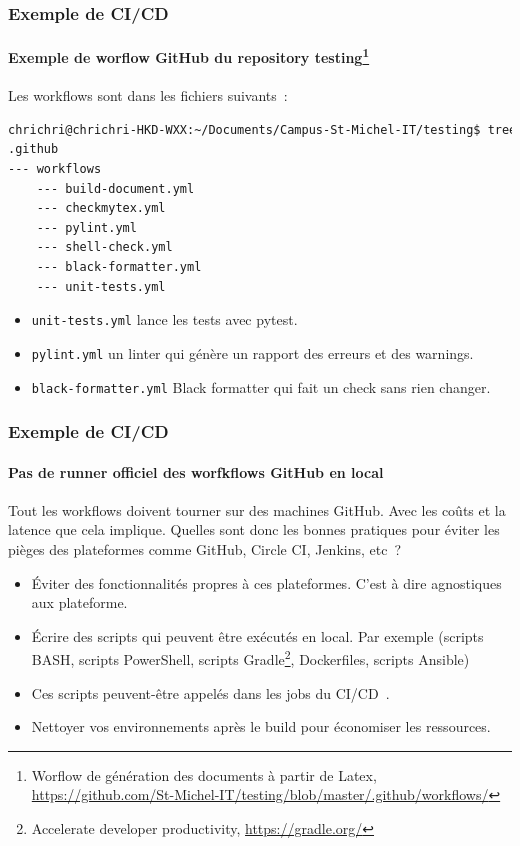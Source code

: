 \documentclass{beamer}
\begin{document}
    \begin{frame}[fragile]
        \frametitle{Exemple de CI/CD}
        \framesubtitle{Exemple de worflow GitHub du repository testing{\footnote{Worflow de génération des documents à partir de Latex, \url{https://github.com/St-Michel-IT/testing/blob/master/.github/workflows/}}}}
        \transdissolve
        Les workflows sont dans les fichiers suivants~:
        \begin{lstlisting}[language=sh]
chrichri@chrichri-HKD-WXX:~/Documents/Campus-St-Michel-IT/testing$ tree .github
.github
--- workflows
    --- build-document.yml
    --- checkmytex.yml
    --- pylint.yml
    --- shell-check.yml
    --- black-formatter.yml
    --- unit-tests.yml
        \end{lstlisting}
        \begin{itemize}
            \item \lstinline{unit-tests.yml} lance les tests avec pytest.
            \item \lstinline{pylint.yml} un linter qui génère un rapport des erreurs et des warnings.
            \item \lstinline{black-formatter.yml} Black formatter qui fait un check sans rien changer.
        \end{itemize}
    \end{frame}

    \begin{frame}
        \frametitle{Exemple de CI/CD}
        \framesubtitle{Pas de runner officiel des worfkflows GitHub en local}
        \transdissolve
        Tout les workflows doivent tourner sur des machines GitHub.
        Avec les coûts et la latence que cela implique.
        \bigbreak
        Quelles sont donc les bonnes pratiques pour éviter les pièges des plateformes comme GitHub, Circle CI, Jenkins, etc~?
        \pause
        \begin{itemize}
            \item Éviter des fonctionnalités propres à ces plateformes.
            C'est à dire agnostiques aux plateforme.
            \item Écrire des scripts qui peuvent être exécutés en local.
            Par exemple (scripts BASH, scripts PowerShell, scripts Gradle\footnote{\label{gradle}Accelerate developer productivity, \url{https://gradle.org/}}, Dockerfiles, scripts Ansible)
            \item Ces scripts peuvent-être appelés dans les jobs du CI/CD~.
            \item Nettoyer vos environnements après le build pour économiser les ressources.
        \end{itemize}
    \end{frame}
\end{document}

